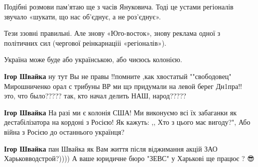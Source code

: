 \begin{itemize}
 

Подібні розмови пам’ятаю ще з часів Януковича. Тоді це устами регіоналів
звучало «шукати, що нас об’єднує, а не роз’єднує».

Тези ззовні правильні. Але знову «Юго-восток», знову реклама одної з політичних
сил (чергової реінкарнацііі «регіоналів»).

Україна може буде або українською, або чиєюсь колонією.

\begin{itemize}
 
\textbf{Ігор Швайка} ну тут Вы не правы !!помните ,как хвостатый ""свободовец"
Мирошниченко орал с трибуны ВР ми щэ придумали на левой берег Дн1пра!! это, что
было????? так, кто начал делить НАШ, народ?????

 
\textbf{Ігор Швайка} На разі ми є колонія США! Ми виконуємо всі їх забаганки як
дестабілізатора на кордоні з Росією! Як кажуть: ,, Хто з цього має вигоду?",
Або війна з Росією до останнього українця?

 
\textbf{Ігор Швайка} пан Швайка як Вам життя після віджимання акцій ЗАО Харьковводстрой?)))) А ваше юридичне бюро "ЗЕВС" у Харькові ще працює ? 😎\Laughey[1.0][white]🥴

 

\end{itemize}
\end{itemize}

